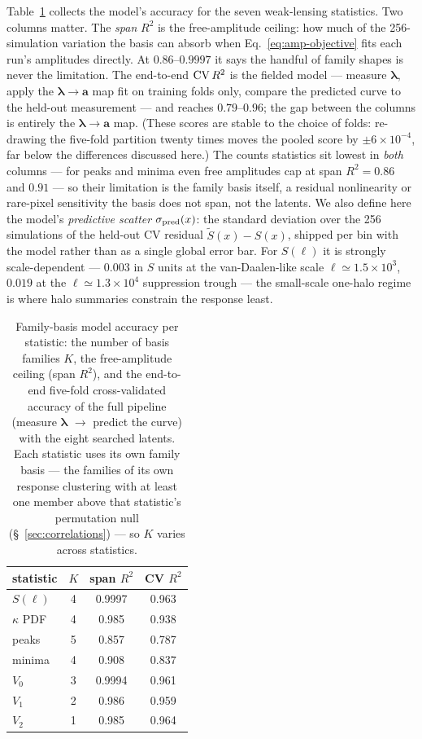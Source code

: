 \documentclass[linenumbers,trackchanges, twocolumn]{aastex701}
\begin{document}
Table~\ref{tab:family_model} collects the model's accuracy for the
seven weak-lensing statistics. Two columns matter. The \emph{span}
$R^2$ is the free-amplitude ceiling: how much of the 256-simulation
variation the basis can absorb when Eq.~\ref{eq:amp-objective} fits
each run's amplitudes directly. At $0.86$--$0.9997$ it says the handful
of family shapes is never the limitation. The end-to-end
${\rm CV}\,R^2$ is the fielded model --- measure $\bm{\lambda}$, apply
the $\bm{\lambda}\to\bm{a}$ map fit on training folds only, compare the
predicted curve to the held-out measurement --- and reaches
$0.79$--$0.96$; the gap between the columns is entirely the
$\bm{\lambda}\to\bm{a}$ map. (These scores are stable to the choice of
folds: re-drawing the five-fold partition twenty times moves the
pooled score by $\pm 6\times10^{-4}$, far below the differences
discussed here.) The counts statistics sit lowest in \emph{both}
columns --- for peaks and minima even free amplitudes cap at span
$R^2 = 0.86$ and $0.91$ --- so their limitation is the family basis
itself, a residual nonlinearity or rare-pixel sensitivity the basis
does not span, not the latents. We also define here the model's
\emph{predictive scatter} $\sigma_{\rm pred}(x)$: the standard
deviation over the 256 simulations of the held-out CV residual
$\tilde S(x) - S(x)$, shipped per bin with the model rather than as a
single global error bar. For $S(\ell)$ it is strongly scale-dependent
--- $0.003$ in $S$ units at the van-Daalen-like scale
$\ell \simeq 1.5\times10^3$, $0.019$ at the $\ell \simeq 1.3\times10^4$
suppression trough --- the small-scale one-halo regime is where halo
summaries constrain the response least.

\begin{table}
\centering
\caption{Family-basis model accuracy per statistic: the number of basis
families $K$, the free-amplitude ceiling (span $R^2$), and the
end-to-end five-fold cross-validated accuracy of the full pipeline
(measure $\bm{\lambda}$ $\to$ predict the curve) with the eight
searched latents. Each statistic uses its own family basis --- the
families of its own response clustering with at least one member above
that statistic's permutation null (\S~\ref{sec:correlations}) --- so
$K$ varies across statistics.}
\label{tab:family_model}
\begin{tabular}{lccc}
\hline
statistic & $K$ & span $R^2$ & CV $R^2$ \\
\hline
$S(\ell)$          & 4 & 0.9997 & 0.963 \\
$\kappa$ PDF       & 4 & 0.985  & 0.938 \\
peaks              & 5 & 0.857  & 0.787 \\
minima             & 4 & 0.908  & 0.837 \\
$V_0$              & 3 & 0.9994 & 0.961 \\
$V_1$              & 2 & 0.986  & 0.959 \\
$V_2$              & 1 & 0.985  & 0.964 \\
\hline
\end{tabular}
\end{table}
\end{document}
